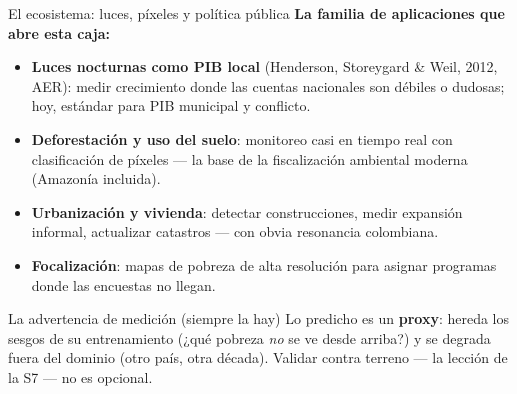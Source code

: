 \documentclass{beamer}
\newcommand{\1}{\mathbb{I}}
\begin{document}
\begin{frame}{El ecosistema: luces, píxeles y política pública}
\small
\textbf{La familia de aplicaciones que abre esta caja:}
\begin{itemize}\itemsep5pt
  \item \textbf{Luces nocturnas como PIB local} (Henderson, Storeygard \& Weil, 2012, AER): medir crecimiento donde las cuentas nacionales son débiles o dudosas; hoy, estándar para PIB municipal y conflicto. \pause
  \item \textbf{Deforestación y uso del suelo}: monitoreo casi en tiempo real con clasificación de píxeles --- la base de la fiscalización ambiental moderna (Amazonía incluida). \pause
  \item \textbf{Urbanización y vivienda}: detectar construcciones, medir expansión informal, actualizar catastros --- con obvia resonancia colombiana. \pause
  \item \textbf{Focalización}: mapas de pobreza de alta resolución para asignar programas donde las encuestas no llegan.
\end{itemize}
\pause

\vspace{0.1cm}
\begin{block}{La advertencia de medición (siempre la hay)}
Lo predicho es un \textbf{proxy}: hereda los sesgos de su entrenamiento (¿qué pobreza \emph{no} se ve desde arriba?) y se degrada fuera del dominio (otro país, otra década). Validar contra terreno --- la lección de la S7 --- no es opcional.
\end{block}
\end{frame}
\end{document}
